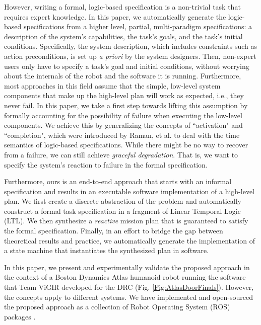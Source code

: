 However, writing a formal, logic-based specification is a non-trivial task that requires expert knowledge.
In this paper, we automatically generate the logic-based specifications from a higher level, partial, multi-paradigm specifications: a description of the system's capabilities, the task's goals, and the task's initial conditions.
Specifically, the system description, which includes constraints such as action preconditions, is set up \emph{a priori} by the system designers.
Then, non-expert users only have to specify a task's goal and initial conditions, without worrying about the internals of the robot and the software it is running.
Furthermore, most approaches in this field assume that the simple, low-level system components that make up the high-level plan will work as expected, i.e., they never fail.
In this paper, we take a first step towards lifting this assumption by formally accounting for the possibility of failure when executing the low-level components.
We achieve this by generalizing the concepts of ``activation" and ``completion", which were introduced by Raman, et al. \cite{Vasu2013ICRA, Vasu2015TRO} to deal with the time semantics of logic-based specifications.
While there might be no way to recover from a failure, we can still achieve \emph{graceful degradation}.
That is, we want to specify the system's reaction to failure in the formal specification.

Furthermore, ours is an end-to-end approach that starts with an informal specification and results in an executable software implementation of a high-level plan.
We first create a discrete abstraction of the problem and automatically construct a formal task specification in a fragment of Linear Temporal Logic (\textsc{LTL}).
We then synthesize a \emph{reactive} mission plan that is guaranteed to satisfy the formal specification.
Finally, in an effort to bridge the gap between theoretical results and practice, we automatically generate the implementation of a state machine that instantiates the synthesized plan in software.

In this paper, we present and experimentally validate the proposed approach in the context of a Boston Dynamics Atlas humanoid robot running the software that Team ViGIR developed for the DRC (Fig. \ref{Fig:AtlasDoorFinals}).
However, the concepts apply to different systems.
We have implemented and open-sourced the proposed approach as a collection of Robot Operating System (ROS) packages \cite{ROS2009ICRA, ROS}.


